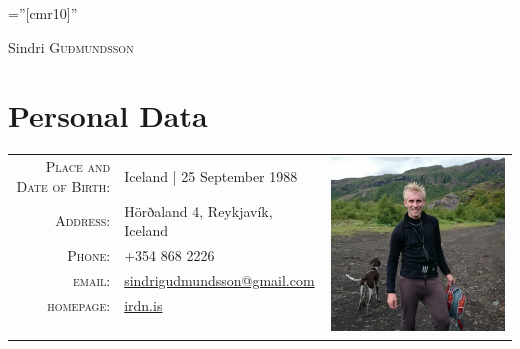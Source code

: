 \documentclass[a4paper,10pt]{article}
\begin{document}
\pagestyle{empty} %

\font\fb=''[cmr10]'' %

\par{\centering
		{\Huge Sindri \textsc{Guðmundsson}
	}\bigskip\par}

\section{Personal Data}

\begin{tabular}{rlr}
    \textsc{Place and Date of Birth:} & Iceland | 25 September 1988
    &\multirow{9}{*}{\includegraphics[scale=0.18]{sindri}}\\
    \textsc{Address:}   & Hörðaland 4, Reykjavík, Iceland \\
    \textsc{Phone:}     & +354 868 2226\\
    \textsc{email:}     & \href{mailto:sindrigudmundsson@gmail.com}{sindrigudmundsson@gmail.com}\\
    \textsc{homepage:}     & \href{https://irdn.is}{irdn.is} \\
    \multicolumn{3}{c}{} \\
    \multicolumn{3}{c}{} \\
    \multicolumn{3}{c}{} \\
    \multicolumn{3}{c}{} \\
\end{tabular}
\end{document}

